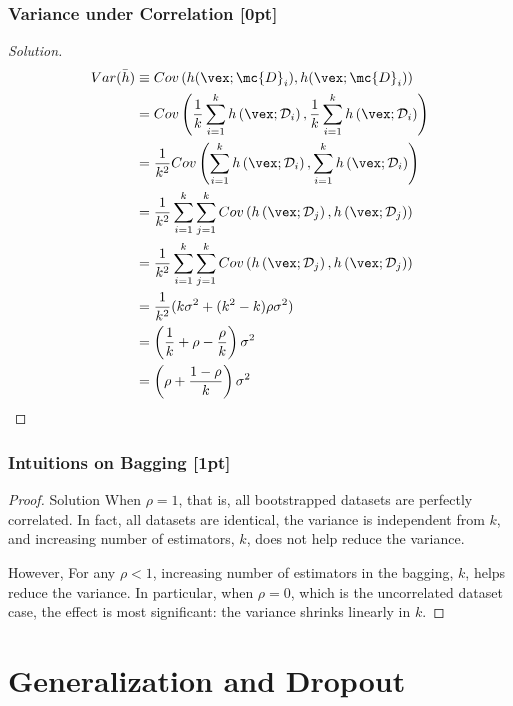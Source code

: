 \documentclass{article}
\begin{document}
	\subsubsection{Variance under Correlation [0pt]}
	\begin{proof}[Solution]
		\begin{align}
			Var(\bar{h}) &\equiv Cov\left(h(\vex;\mc{D}_i), h(\vex;\mc{D}_i)\right) \\
			&= Cov\left(\frac{1}{k} \sum_{i=1}^{k}
				h\left(\vex ; \mathcal{D}_{i}\right),
				\frac{1}{k} \sum_{i=1}^{k}
				h\left(\vex ; \mathcal{D}_{i}\right)\right) \\
			&= \frac{1}{k^2} Cov\left(\sum_{i=1}^{k}
				h\left(\vex ; \mathcal{D}_{i}\right),
				\sum_{i=1}^{k}
				h\left(\vex ; \mathcal{D}_{i}\right)\right) \\
			&= \frac{1}{k^2} \sum_{i=1}^{k} \sum_{j=1}^{k}
			Cov\left(
				h\left(\vex ; \mathcal{D}_{j}\right),
				h\left(\vex ; \mathcal{D}_{j}\right)\right) \\
			&= \frac{1}{k^2} \sum_{i=1}^{k} \sum_{j=1}^{k}
			Cov\left(
				h\left(\vex ; \mathcal{D}_{j}\right),
				h\left(\vex ; \mathcal{D}_{j}\right)\right) \\
			&= \frac{1}{k^2} (k \sigma^2 + (k^2-k) \rho \sigma^2) \\
			&= \left(
			\frac{1}{k} + \rho - \frac{\rho}{k}
			\right) \sigma^2 \\
			&= \left(
			\rho + \frac{1 - \rho}{k}
			\right) \sigma^2
		\end{align}
	\end{proof}
	
	\subsubsection{Intuitions on Bagging [1pt]}
	\begin{proof}{Solution}
		When $\rho = 1$, that is, all bootstrapped datasets are perfectly correlated. In fact, all datasets are identical, the variance is independent from $k$, and increasing number of estimators, $k$, does not help reduce the variance.
		
		However, For any $\rho < 1$, increasing number of estimators in the bagging, $k$, helps reduce the variance. In particular, when $\rho = 0$, which is the uncorrelated dataset case, the effect is most significant: the variance shrinks linearly in $k$. 
	\end{proof}
	
	\section{Generalization and Dropout}
\end{document}
